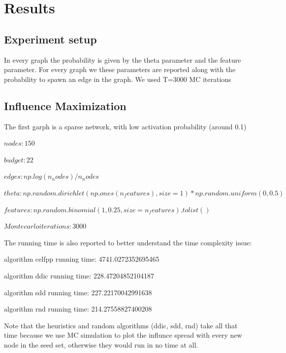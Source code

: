 \newpage
\section{Results}

\subsection{Experiment setup}


In every graph the probability is given by the theta parameter and the feature parameter.
For every graph we these parameters are reported along with the probability to spawn an edge in the graph.
We used T=3000 MC iterations

\subsection{Influence Maximization}

The first garph is a sparse network, with low activation probability (around 0.1)

$nodes: 150$

$budget: 22$

$edges: np.log(n_nodes) / n_nodes$

$theta: np.random.dirichlet(np.ones(n_features), size=1) * np.random.uniform(0, 0.5)$

$features: np.random.binomial(1, 0.25, size=n_features).tolist()$

$Montecarlo iterations: 3000$

The running time is also reported to better understand the time complexity issue:

algorithm celfpp running time: 4741.0272352695465

algorithm ddic running time: 228.47204852104187

algorithm sdd running time: 227.22170042991638

algorithm rnd running time: 214.27558827400208

Note that the heuristics and random algorithms (ddic, sdd, rnd) take all that time because we use MC simulation to plot the influnce spread with every new node in the seed set, otherwise they would run in no time at all.


